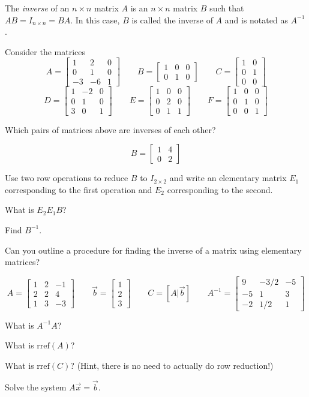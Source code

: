 \documentclass[14pt]{problemset}
\newcommand{\rref}{\mathrm{rref}}
\newcommand{\mat}[1]{\begin{bmatrix}#1\end{bmatrix}}
\begin{document}
	\begin{definition}
		The \emph{inverse} of an $n\times n$ matrix $A$ is an $n\times n$
		matrix $B$ such that $AB=I_{n\times n}=BA$.
		In this case, $B$ is called the inverse of $A$ and is notated as $A^{-1}$.
	\end{definition}

	\question
	Consider the matrices 
	\[
		A=\mat{1&2&0\\0&1&0\\-3&-6&1}\qquad
		B=\mat{1&0&0\\0&1&0}\qquad
		C=\mat{1&0\\0&1\\0&0}
	\]
	\[
		D=\mat{1&-2&0\\0&1&0\\3&0&1}\qquad
		E=\mat{1&0&0\\0&2&0\\0&1&1}\qquad
		F=\mat{1&0&0\\0&1&0\\0&0&1}
	\]
	\begin{parts}
		\item Which pairs of matrices above are inverses of each other?
	\end{parts}

	\newpage
	\question
	\[
		B=\mat{1 &4\\0 &2}
	\]
	\begin{parts}
		\item Use two row operations to reduce $B$ to $I_{2\times 2}$
		and write an elementary matrix $E_1$ corresponding to the first operation
		and $E_2$ corresponding to the second.
		\item What is $E_2E_1B$?
		\item Find $B^{-1}$.
		\item Can you outline a procedure for finding the inverse of a matrix
		using elementary matrices?
	\end{parts}

	\question
	\[
		A=\mat{1&2&-1\\2&2&4\\1&3&-3}\qquad
		\vec b=\mat{1\\2\\3}\qquad
		C=[A|\vec b]\qquad
		A^{-1}=\mat{9&-3/2&-5\\-5&1&3\\-2&1/2&1}
	\]
	\begin{parts}
		\item What is $A^{-1}A$?
		\item What is $\rref(A)$?
		\item What is $\rref(C)$? (Hint, there is no need to actually do row reduction!)
		\item Solve the system $A\vec x=\vec b$.
	\end{parts}
\end{document}
